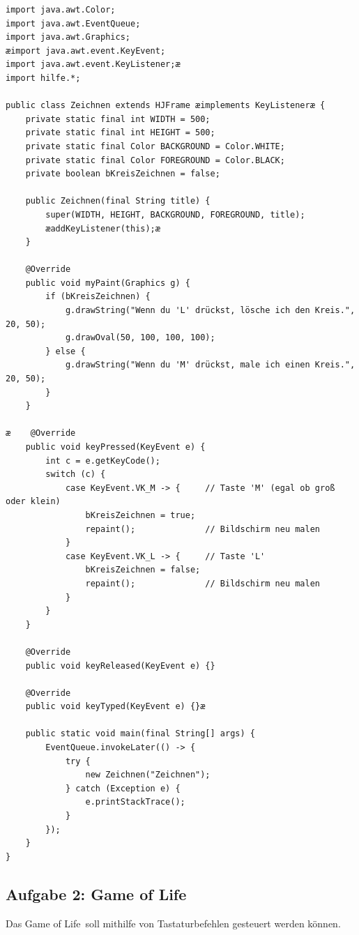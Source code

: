 \begin{lstlisting}
import java.awt.Color;
import java.awt.EventQueue;
import java.awt.Graphics;
æimport java.awt.event.KeyEvent;
import java.awt.event.KeyListener;æ
import hilfe.*;

public class Zeichnen extends HJFrame æimplements KeyListeneræ {
    private static final int WIDTH = 500;
    private static final int HEIGHT = 500;
    private static final Color BACKGROUND = Color.WHITE;
    private static final Color FOREGROUND = Color.BLACK;
    private boolean bKreisZeichnen = false;

    public Zeichnen(final String title) {
        super(WIDTH, HEIGHT, BACKGROUND, FOREGROUND, title);
        æaddKeyListener(this);æ
    }

    @Override
    public void myPaint(Graphics g) {
        if (bKreisZeichnen) {
            g.drawString("Wenn du 'L' drückst, lösche ich den Kreis.", 20, 50);
            g.drawOval(50, 100, 100, 100);
        } else {
            g.drawString("Wenn du 'M' drückst, male ich einen Kreis.", 20, 50);
        }
    }

æ    @Override
    public void keyPressed(KeyEvent e) { 
        int c = e.getKeyCode();
        switch (c) {
            case KeyEvent.VK_M -> {     // Taste 'M' (egal ob groß oder klein)
                bKreisZeichnen = true;
                repaint();              // Bildschirm neu malen
            }
            case KeyEvent.VK_L -> {     // Taste 'L'
                bKreisZeichnen = false;
                repaint();              // Bildschirm neu malen
            }
        }
    }

    @Override
    public void keyReleased(KeyEvent e) {}

    @Override
    public void keyTyped(KeyEvent e) {}æ

    public static void main(final String[] args) {
        EventQueue.invokeLater(() -> {
            try {
                new Zeichnen("Zeichnen");
            } catch (Exception e) {
                e.printStackTrace();
            }
        });
    }
}
\end{lstlisting}


\subsection{Aufgabe 2: Game of Life}

Das \glqq Game of Life\grqq\ soll mithilfe von Tastaturbefehlen gesteuert werden können.

